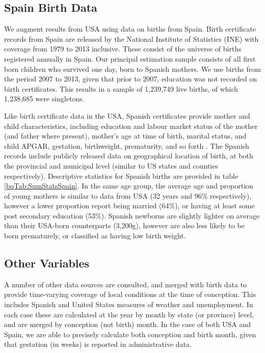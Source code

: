 \documentclass[a4paper, 11 pt]{article}
\theoremstyle{plain}
\begin{document}
\begin{spacing}{1.4}
\subsection{Spain Birth Data}
We augment results from USA using data on births from Spain. Birth certificate 
records from Spain are released by the National Institute of Statistics (INE) 
with coverage from 1979 to 2013 inclusive. These consist of the universe of 
births registered annually in Spain. Our principal estimation sample consists of 
all first born children who survived one day, born to Spanish mothers. We use 
births from the period 2007 to 2013, given that prior to 2007, education was not 
recorded on birth certificates.  This results in a sample of 1,239,749 live 
births, of which 1,238,685 were singletons.

Like birth certificate data in the USA, Spanish certificates provide mother
and child characteristics, including education and labour market status of the 
mother (and father where present), mother's age at time of birth, marital 
status, and child APGAR, gestation, birthweight, prematurity, and so forth
\citep{INE2013}.  The Spanish records include publicly released data on 
geographical location of birth, at both the provincial and municipal level 
(similar to US states and counties respectively).  Descriptive statistics for
Spanish births are provided in table \ref{bqTab:SumStatsSpain}.  In the same
age group, the average age and proportion of young mothers is similar to data
from USA (32 years and 96\% respectively), however a lower proportion report
being married (64\%), or having at least some post secondary education (53\%).
Spanish newborns are slightly lighter on average than their USA-born 
counterparts (3,200g), however are also less likely to be born prematurely,
or classified as having low birth weight.

\subsection{Other Variables}
A number of other data sources are consulted, and merged with birth data to
provide time-varying coverage of local conditions at the time of conception.  
This includes Spanish and United States measures of weather and unemployment.  
In each case these are calculated at the year by month by state (or province) 
level, and are merged by conception (not birth) month.  In the case of both USA 
and Spain, we are able to precisely calculate both conception and birth month, 
given that gestation (in weeks) is reported in administrative data.


\end{spacing}
\end{document}
